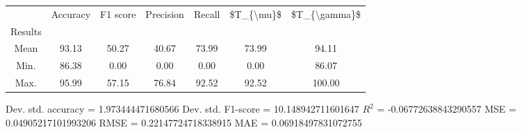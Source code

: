 \begin{tabular}{|c|c|c|c|c|c|c|}
\toprule
{} &  Accuracy &  F1 score &  Precision &  Recall &  \$T\_\{\textbackslash mu\}\$ &  \$T\_\{\textbackslash gamma\}\$ \\
Results &           &           &            &         &            &               \\
\hline
Mean    &     93.13 &     50.27 &      40.67 &   73.99 &      73.99 &         94.11 \\
Min.    &     86.38 &      0.00 &       0.00 &    0.00 &       0.00 &         86.07 \\
Max.    &     95.99 &     57.15 &      76.84 &   92.52 &      92.52 &        100.00 \\
\bottomrule
\end{tabular}

 Dev. std. accuracy = 1.973444471680566
 Dev. std. F1-score = 10.148942711601647
 $R^2$ = -0.06772638843290557
 MSE = 0.04905217101993206
 RMSE = 0.22147724718338915
 MAE = 0.06918497831072755